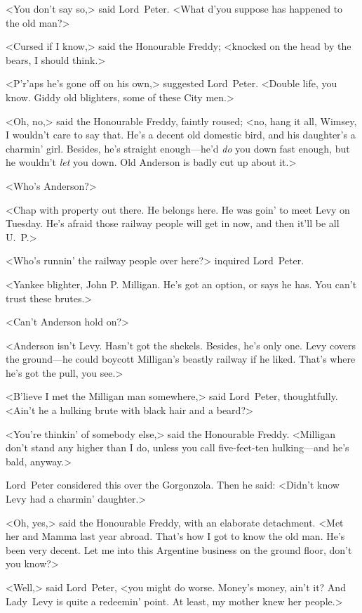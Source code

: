 <You don't say so,> said Lord~Peter. <What d'you suppose has happened to the old man?>

<Cursed if I know,> said the Honourable Freddy; <knocked on the head by the bears, I should think.>

<P'r'aps he's gone off on his own,> suggested Lord~Peter. <Double life, you know. Giddy old blighters, some of these City men.>

<Oh, no,> said the Honourable Freddy, faintly roused; <no, hang it all, Wimsey, I wouldn't care to say that. He's a decent old domestic bird, and his daughter's a charmin' girl. Besides, he's straight enough—he'd \textit{do} you down fast enough, but he wouldn't \textit{let} you down. Old Anderson is badly cut up about it.>

<Who's Anderson?>

<Chap with property out there. He belongs here. He was goin' to meet Levy on Tuesday. He's afraid those railway people will get in now, and then it'll be all U\@.~P\@.>

<Who's runnin' the railway people over here?> inquired Lord~Peter.

<Yankee blighter, John P\@. Milligan. He's got an option, or says he has. You can't trust these brutes.>

<Can't Anderson hold on?>

<Anderson isn't Levy. Hasn't got the shekels. Besides, he's only one. Levy covers the ground—he could boycott Milligan's beastly railway if he liked. That's where he's got the pull, you see.>

<B'lieve I met the Milligan man somewhere,> said Lord~Peter, thoughtfully. <Ain't he a hulking brute with black hair and a beard?>

<You're thinkin' of somebody else,> said the Honourable Freddy. <Milligan don't stand any higher than I do, unless you call five-feet-ten hulking—and he's bald, anyway.>

Lord~Peter considered this over the Gorgonzola. Then he said: <Didn't know Levy had a charmin' daughter.>

<Oh, yes,> said the Honourable Freddy, with an elaborate detachment. <Met her and Mamma last year abroad. That's how I got to know the old man. He's been very decent. Let me into this Argentine business on the ground floor, don't you know?>

<Well,> said Lord~Peter, <you might do worse. Money's money, ain't it? And Lady~Levy is quite a redeemin' point. At least, my mother knew her people.>

